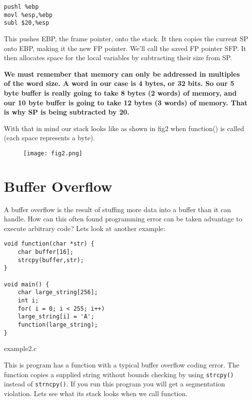 \documentclass[a4paper]{article}
\begin{document}
\begin{verbatim}
pushl %ebp
movl %esp,%ebp
subl $20,%esp
\end{verbatim}

This pushes EBP, the frame pointer, onto the stack. It then copies the current SP onto EBP, making it the new FP pointer. We’ll call the saved FP pointer SFP. It then allocates space for the local variables by subtracting their size from SP.

\textbf{We must remember that memory can only be addressed in multiples of the word size. A word in our case is 4 bytes, or 32 bits. So our 5 byte buffer is really going to take 8 bytes (2 words) of memory, and our 10 byte buffer is going to take 12 bytes (3 words) of memory. That is why SP is being subtracted by 20.}

With that in mind our stack looks like as shown in fig2 when function() is called (each space represents a byte).

\begin{figure}[H]
\centering
\texttt{[image: fig2.png]}
\end{figure}

\section{Buffer Overflow}

A buffer overflow is the result of stuffing more data into a buffer than it can handle. How can this often found programming error can be taken advantage to execute arbitrary code? Lets look at another example:

\begin{listing}[ht]
\begin{verbatim}
void function(char *str) {
	char buffer[16];
	strcpy(buffer,str);
}

void main() {
	char large_string[256];
	int i;
	for( i = 0; i < 255; i++)
	large_string[i] = 'A';
	function(large_string);
}
\end{verbatim}
\caption{example2.c}
\label{listing:1}
\end{listing}

This is program has a function with a typical buffer overflow coding error. The function copies a supplied string without bounds checking by using \texttt{strcpy()} instead of \texttt{strncpy()}. If you run this program you will get a segmentation violation. Lets see what its stack looks when we call function.
\end{document}
